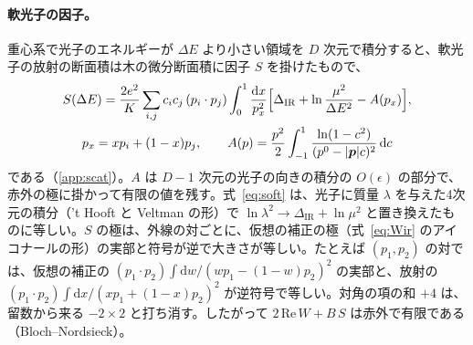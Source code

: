 \documentclass[a4paper,10pt]{ltjsarticle}
\newcommand{\dd}{\mathrm{d}}
\newcommand{\DIR}{\Delta_{\mathrm{IR}}}
\begin{document}
\paragraph{軟光子の因子。}重心系で光子のエネルギーが $\Delta E$ より小さい領域を $D$ 次元で積分すると、軟光子の放射の断面積は木の微分断面積に因子 $S$ を掛けたもので、
\begin{equation}
\begin{gathered}
S(\Delta E)=\frac{2e^2}{K}\sum_{i,j}c_ic_j\,(p_i\cdot p_j)\int_0^1\frac{\dd x}{p_x^2}\Bigl[\DIR+\ln\frac{\mu^2}{\Delta E^2}-A(p_x)\Bigr],\\
p_x=xp_i+(1-x)p_j,\qquad A(p)=\frac{p^2}{2}\int_{-1}^1\frac{\ln(1-c^2)}{(p^0-|\boldsymbol p|c)^2}\,\dd c
\end{gathered}
\label{eq:soft}
\end{equation}
である（\ref{app:scat}）。$A$ は $D-1$ 次元の光子の向きの積分の $O(\epsilon)$ の部分で、赤外の極に掛かって有限の値を残す。式~\eqref{eq:soft} は、光子に質量 $\lambda$ を与えた4次元の積分（'t Hooft と Veltman の形）で $\ln\lambda^2\to\DIR+\ln\mu^2$ と置き換えたものに等しい。$S$ の極は、外線の対ごとに、仮想の補正の極（式~\eqref{eq:Wir} のアイコナールの形）の実部と符号が逆で大きさが等しい。たとえば $(p_1,p_2)$ の対では、仮想の補正の $(p_1\cdot p_2)\int\dd w/(wp_1-(1-w)p_2)^2$ の実部と、放射の $(p_1\cdot p_2)\int\dd x/(xp_1+(1-x)p_2)^2$ が逆符号で等しい。対角の項の和 $+4$ は、留数から来る $-2\times2$ と打ち消す。したがって $2\,\mathrm{Re}\,W+B\,S$ は赤外で有限である（Bloch--Nordsieck）。
\end{document}

